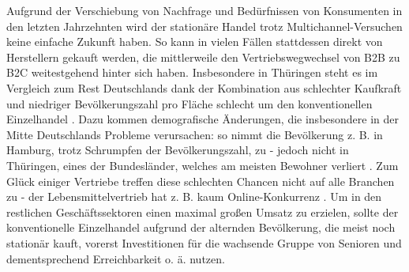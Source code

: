 



\begin{folding} %

Aufgrund der Verschiebung von Nachfrage und Bedürfnissen von Konsumenten in den letzten Jahrzehnten wird der stationäre Handel trotz Multichannel-Versuchen keine einfache Zukunft haben. So kann in vielen Fällen stattdessen direkt von Herstellern gekauft werden, die mittlerweile den Vertriebswegwechsel von \ac{B2B} zu \ac{B2C} weitestgehend hinter sich haben. 
Insbesondere in Thüringen steht es im Vergleich zum Rest Deutschlands dank der Kombination aus schlechter Kaufkraft und niedriger Bevölkerungszahl pro Fläche schlecht um den konventionellen Einzelhandel \cite[S. 29]{Nitt}. Dazu kommen demografische Änderungen, die insbesondere in der Mitte Deutschlands Probleme verursachen: so nimmt die Bevölkerung z. B. in Hamburg, trotz Schrumpfen der Bevölkerungszahl, zu - jedoch nicht in Thüringen, eines der Bundesländer, welches am meisten Bewohner verliert \cite[S. 32f]{Nitt}. 
Zum Glück einiger Vertriebe treffen diese schlechten Chancen nicht auf alle Branchen zu - der Lebensmittelvertrieb hat z. B. kaum Online-Konkurrenz \cite{corona-schub}. Um in den restlichen Geschäftssektoren einen maximal großen Umsatz zu erzielen, sollte der konventionelle Einzelhandel aufgrund der alternden Bevölkerung, die meist noch stationär kauft, vorerst Investitionen für die wachsende Gruppe von Senioren und dementsprechend Erreichbarkeit o. ä. nutzen.

\end{folding}

